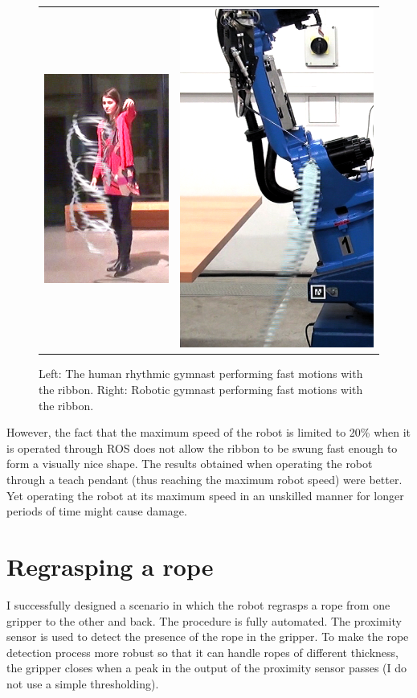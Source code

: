         \begin{figure}[h]
            \centering
            \begin{tabular}{cc}
            \includegraphics[height=0.39\textwidth]{Img/ribbon/HumanGymnastShapes.png}
            &
            \includegraphics[height=0.39\textwidth]{Img/ribbon/RobotGymnastShapes.png}
            \end{tabular}
            \caption{Left: The human rhythmic gymnast performing fast motions with the ribbon. Right: Robotic gymnast performing fast motions with the ribbon.}
            \label{fig:HumanAndRobotGymnastShapes}
        \end{figure}

        However, the fact that the maximum speed of the robot is limited to 20\% when it is operated through ROS does not allow the ribbon to be swung fast enough to form a visually nice shape. The results obtained when operating the robot through a teach pendant (thus reaching the maximum robot speed) were better. Yet operating the robot at its maximum speed in an unskilled manner for longer periods of time might cause damage.

    \section{Regrasping a rope}
        I successfully designed a scenario in which the \CloPeMa\/ robot regrasps a rope from one gripper to the other and back. The procedure is fully automated. The proximity sensor is used to detect the presence of the rope in the gripper. To make the rope detection process more robust so that it can handle ropes of different thickness, the gripper closes when a peak in the output of the proximity sensor passes (I do not use a simple thresholding).

